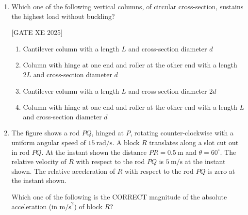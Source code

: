 \documentclass[journal,12pt,onecolumn]{IEEEtran}
\theoremstyle{remark}
\begin{document}
\begin{enumerate}
\hfill[GATE XE 2025]


\begin{multicols}{2}
\begin{enumerate}
\item 862.2
\item 1116.6
\item 2900.0
\item 406.2
\end{enumerate}
\end{multicols}

\item Which one of the following vertical columns, of circular cross-section, sustains the highest load without buckling?


\hfill[GATE XE 2025]


\begin{multicols}{2}
\begin{enumerate}
\item Cantilever column with a length $L$ and cross-section diameter $d$
\item Column with hinge at one end and roller at the other end with a length $2L$ and cross-section diameter $d$
\item Cantilever column with a length $L$ and cross-section diameter $2d$
\item Column with hinge at one end and roller at the other end with a length $L$ and cross-section diameter $d$
\end{enumerate}
\end{multicols}

\item The figure shows a rod $PQ$, hinged at $P$, rotating counter-clockwise with a uniform angular speed of $15~\text{rad/s}$. A block $R$ translates along a slot cut out in rod $PQ$. At the instant shown the distance $PR=0.5~\text{m}$ and $\theta=60^\circ$. The relative velocity of $R$ with respect to the rod $PQ$ is $5~\text{m/s}$ at the instant shown. The relative acceleration of $R$ with respect to the rod $PQ$ is zero at the instant shown.

Which one of the following is the CORRECT magnitude of the absolute acceleration (in $\text{m/s}^2$) of block $R$?


\end{enumerate}
\end{document}
